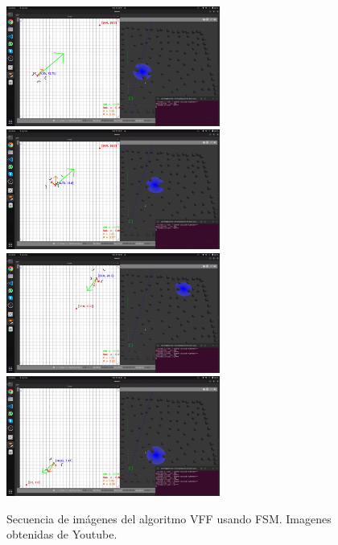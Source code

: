 \begin{figure} [H]
    \begin{center}
        \includegraphics[width=7cm]{figs/c6/FSM_final1.png}
        \includegraphics[width=7cm]{figs/c6/FSM_final2.png}
        \includegraphics[width=7cm]{figs/c6/FSM_final3.png}
        \includegraphics[width=7cm]{figs/c6/FSM_final4.png}
    \end{center}
    \caption[Secuencia VFF con FSM]{Secuencia de imágenes del algoritmo VFF usando FSM. Imagenes obtenidas de Youtube\footnotemark.}
    \label{fig:sec_FSM_final}
\end{figure}






